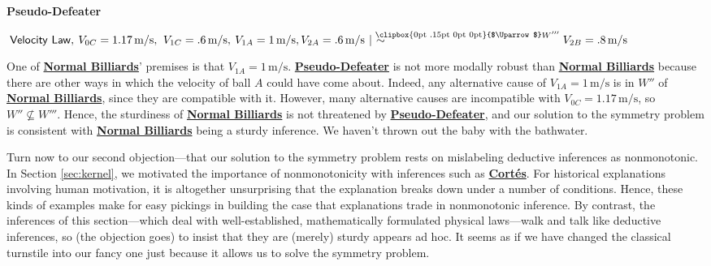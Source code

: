 \documentclass{article}                     %
\makeatletter
\newcommand{\Uuparrow}{%
	\raisebox{.2ex}{\clipbox{0pt .15pt 0pt 0pt}{$\Uparrow$}}
}
\newcommand{\nms}{%
	\mathbin{\mathpalette\@nms\expandafter}
}
\newcommand{\@nms}{\mid\joinrel\mkern-.5mu\sim}
\newcommand{\mrc}[1]{\mathbin{
		\mathchoice
		{\normalsize\hspace{.5mm}\nms^{\mkern-19mu\scriptsize\Uuparrow#1}\hspace{-.5mm}}
		{\normalsize\hspace{.5mm}\nms^{\mkern-19mu\scriptsize\Uuparrow#1}\hspace{-.5mm}}
		{\footnotesize\hspace{.5mm}\nms^{\mkern-13.5mu\fontsize{5.5}{0}\Uuparrow#1}}
		{\scriptsize\nms^{\mkern-10mu\tiny\Uuparrow#1}}
	}
}
\makeatother
\begin{document}
\noindent \label{eq:MRC_defeater2}\textbf{Pseudo-Defeater}\hspace{8.25mm}\begin{minipage}[t]{.8\textwidth}
	$\hspace{.5ex} \mathsf{Velocity\ Law},\hspace{.5ex} V_{0C} = 1.17 \,\text{m/s},\,\hspace{.5ex} V_{1C} = .6\,\text{m/s},\hspace{.5ex} V_{1A} = 1\,\text{m/s},\\ V_{2A} = .6\,\text{m/s} \mrc{W'''}\, V_{2B} = .8\,\text{m/s}$
\end{minipage}\vspace{3mm} 

\noindent One of \hyperref[eq:MRC_ballsforward]{\textbf{Normal Billiards}}' premises is that $V_{1A} = 1\,\text{m/s}$. \hyperref[eq:MRC_defeater2]{\textbf{Pseudo-Defeater}} is not more modally robust than \hyperref[eq:MRC_ballsforward]{\textbf{Normal Billiards}} because there are other ways in which the velocity of ball $A$ could have come about. Indeed, any alternative cause of $V_{1A} =1\,\text{m/s}$ is in $W''$ of \hyperref[eq:MRC_ballsforward]{\textbf{Normal Billiards}}, since they are compatible with it.  However, many alternative causes are incompatible with $V_{0C} = 1.17 \,\text{m/s}$, so $W'' \not\subseteq W'''$.  Hence, the sturdiness of \hyperref[eq:MRC_ballsforward]{\textbf{Normal Billiards}} is not threatened by \hyperref[eq:MRC_defeater2]{\textbf{Pseudo-Defeater}}, and our solution to the symmetry problem is consistent with \hyperref[eq:MRC_ballsforward]{\textbf{Normal Billiards}} being a sturdy inference. We haven't thrown out the baby with the bathwater.

Turn now to our second objection---that our solution to the symmetry problem rests on mislabeling deductive inferences as nonmonotonic. In Section \ref{sec:kernel}, we motivated the importance of nonmonotonicity with inferences such as \hyperref[Cortes]{\textbf{Cort\'{e}s}}. For historical explanations involving human motivation, it is altogether unsurprising that the explanation breaks down under a number of conditions. Hence, these kinds of examples make for easy pickings in building the case that explanations trade in nonmonotonic inference. By contrast, the inferences of this section---which deal with well-established, mathematically formulated physical laws---walk and talk like deductive inferences, so (the objection goes) to insist that they are (merely) sturdy appears ad hoc. It seems as if we have  changed the classical turnstile into our fancy one just because it allows us to solve the symmetry problem. 
\end{document}
